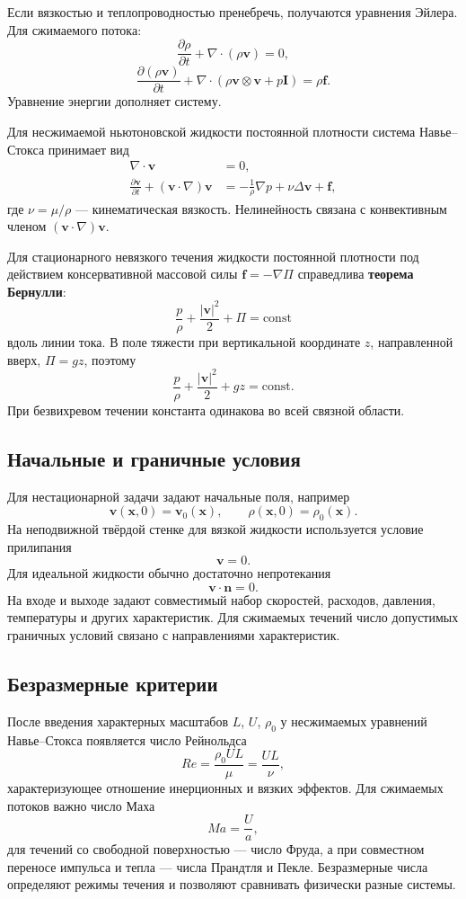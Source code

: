 Если вязкостью и теплопроводностью пренебречь, получаются уравнения Эйлера.
Для сжимаемого потока:
\[
\frac{\partial\rho}{\partial t}+\nabla\cdot(\rho\mathbf v)=0,
\]
\[
\frac{\partial(\rho\mathbf v)}{\partial t}
+\nabla\cdot(\rho\mathbf v\otimes\mathbf v+p\mathbf I)
=\rho\mathbf f.
\]
Уравнение энергии дополняет систему.

Для несжимаемой ньютоновской жидкости постоянной плотности система
Навье--Стокса принимает вид
\[
\boxed{
\begin{aligned}
\nabla\cdot\mathbf v&=0,\\
\frac{\partial\mathbf v}{\partial t}
+(\mathbf v\cdot\nabla)\mathbf v
&=-\frac1\rho\nabla p+\nu\Delta\mathbf v+\mathbf f,
\end{aligned}
}
\]
где $\nu=\mu/\rho$ --- кинематическая вязкость. Нелинейность связана с
конвективным членом $(\mathbf v\cdot\nabla)\mathbf v$.

Для стационарного невязкого течения жидкости постоянной плотности под
действием консервативной массовой силы $\mathbf f=-\nabla\Pi$ справедлива
\textbf{теорема Бернулли}:
\[
\boxed{
\frac{p}{\rho}+\frac{|\mathbf v|^2}{2}+\Pi=\text{const}
}
\]
вдоль линии тока. В поле тяжести при вертикальной координате $z$, направленной
вверх, $\Pi=gz$, поэтому
\[
\frac{p}{\rho}+\frac{|\mathbf v|^2}{2}+gz=\text{const}.
\]
При безвихревом течении константа одинакова во всей связной области.

\subsection{Начальные и граничные условия}

Для нестационарной задачи задают начальные поля, например
\[
\mathbf v(\mathbf x,0)=\mathbf v_0(\mathbf x),
\qquad
\rho(\mathbf x,0)=\rho_0(\mathbf x).
\]
На неподвижной твёрдой стенке для вязкой жидкости используется условие
прилипания
\[
\mathbf v=0.
\]
Для идеальной жидкости обычно достаточно непротекания
\[
\mathbf v\cdot\mathbf n=0.
\]
На входе и выходе задают совместимый набор скоростей, расходов, давления,
температуры и других характеристик. Для сжимаемых течений число допустимых
граничных условий связано с направлениями характеристик.

\subsection{Безразмерные критерии}

После введения характерных масштабов $L$, $U$, $\rho_0$ у несжимаемых
уравнений Навье--Стокса появляется число Рейнольдса
\[
\boxed{Re=\frac{\rho_0UL}{\mu}=\frac{UL}{\nu}},
\]
характеризующее отношение инерционных и вязких эффектов. Для сжимаемых
потоков важно число Маха
\[
Ma=\frac{U}{a},
\]
для течений со свободной поверхностью --- число Фруда, а при совместном
переносе импульса и тепла --- числа Прандтля и Пекле. Безразмерные числа
определяют режимы течения и позволяют сравнивать физически разные системы.


